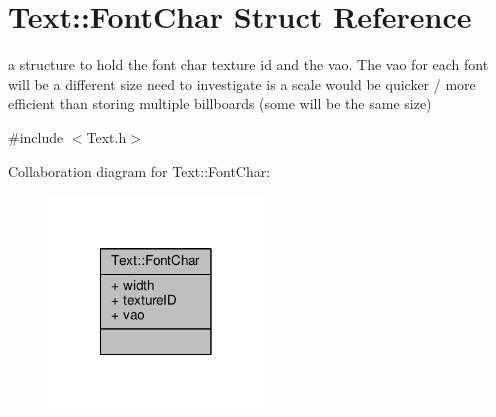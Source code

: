 \hypertarget{struct_text_1_1_font_char}{\section{Text\-:\-:Font\-Char Struct Reference}
\label{struct_text_1_1_font_char}
}


a structure to hold the font char texture id and the vao. The vao for each font will be a different size need to investigate is a scale would be quicker / more efficient than storing multiple billboards (some will be the same size)  




{\ttfamily \#include $<$Text.\-h$>$}



Collaboration diagram for Text\-:\-:Font\-Char\-:
\nopagebreak
\begin{figure}[H]
\begin{center}
\leavevmode
\includegraphics[width=162pt]{struct_text_1_1_font_char__coll__graph}
\end{center}
\end{figure}
